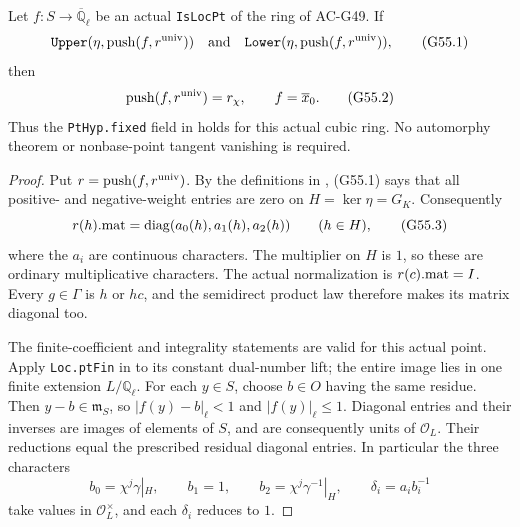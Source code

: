 \begin{theorem}
\label{AC-G55}
Let $f:S\to\overline{\mathbb Q}_\ell$ be an actual
\texttt{IsLocPt} of the ring of AC-G49.  If
\[
 \texttt{Upper}(\eta,\operatorname{push}(f,r^{\rm univ}))
 \quad\hbox{and}\quad
 \texttt{Lower}(\eta,\operatorname{push}(f,r^{\rm univ})),
                                                               \tag{G55.1}
\]
then
\[
              \operatorname{push}(f,r^{\rm univ})=r_\chi,
                \qquad f=\overline{x}_0.                      \tag{G55.2}
\]
Thus the \texttt{PtHyp.fixed} field in
 holds for this
actual cubic ring.  No automorphy theorem or
nonbase-point tangent vanishing is required.
\end{theorem}
\begin{proof}
Put $r=\operatorname{push}(f,r^{\rm univ})$.
By the definitions in
,
(G55.1) says that all positive- and negative-weight
entries are zero on $H=\ker\eta=G_K$.
Consequently
\[
                  r(h).{\rm mat}
                  =\operatorname{diag}(a_0(h),a_1(h),a_2(h))
                              \qquad(h\in H),                 \tag{G55.3}
\]
where the $a_i$ are continuous characters.
The multiplier on $H$ is $1$, so these are ordinary
multiplicative characters.
The actual normalization is $r(c).{\rm mat}=I$.
Every $g\in\Gamma$ is $h$ or $hc$, and the semidirect
product law therefore makes its matrix diagonal too.

The finite-coefficient and integrality statements
are valid for this actual point.
Apply \texttt{Loc.ptFin} in
 to its constant
dual-number lift; the entire image lies in one finite
extension $L/\mathbb Q_\ell$.
For each $y\in S$, choose $b\in O$ having the same
residue.  Then $y-b\in\mathfrak m_S$, so
$|f(y)-b|_\ell<1$ and $|f(y)|_\ell\le1$.
Diagonal entries and their inverses are images of
elements of $S$, and are consequently units of
$\mathcal O_L$.  Their reductions equal the
prescribed residual diagonal entries.
In particular the three characters
\[
 b_0=\chi^j\gamma|_H,\qquad b_1=1,\qquad
 b_2=\chi^j\gamma^{-1}|_H,\qquad
                     \delta_i=a_i b_i^{-1}                   \tag{G55.4}
\]
take values in $\mathcal O_L^\times$, and each
$\delta_i$ reduces to $1$.


\end{proof}

